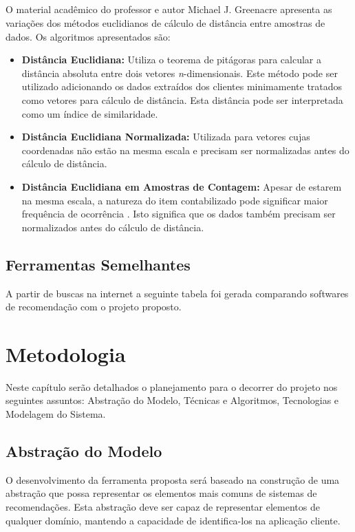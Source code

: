 \documentclass[
	12pt,				%
    oneside,			%
	a4paper,			%
	english,			%
	french,				%
	spanish,			%
	brazil,				%
	]{abntex2}
\begin{document}
\section{}
O material acadêmico do professor e autor Michael J. Greenacre apresenta as variações dos métodos euclidianos de cálculo de distância entre amostras de dados. Os algoritmos apresentados são:

\begin{itemize}
	\item \textbf{Distância Euclidiana:} Utiliza o teorema de pitágoras para calcular a distância absoluta entre dois vetores \textit{n}-dimensionais. Este método pode ser utilizado adicionando os dados extraídos 
	dos clientes minimamente tratados como vetores para cálculo de distância. Esta distância pode ser interpretada como um índice de similaridade.
	\item \textbf{Distância Euclidiana Normalizada:} Utilizada para vetores cujas coordenadas não estão na mesma escala e precisam ser normalizadas antes do cálculo de distância. 
	\item \textbf{Distância Euclidiana em Amostras de Contagem:} Apesar de estarem na mesma escala, a natureza do item contabilizado pode significar maior frequência de ocorrência \cite{7-MeasuresBetweenSamples}. 
	Isto significa que os dados também precisam ser normalizados antes do cálculo de distância. 
\end{itemize}

\section{Ferramentas Semelhantes}
A partir de buscas na internet a seguinte tabela foi gerada comparando softwares de recomendação com o projeto proposto.

\chapter{Metodologia}
Neste capítulo serão detalhados o planejamento para o decorrer do projeto nos seguintes assuntos: Abstração do Modelo, Técnicas e Algoritmos, Tecnologias e
Modelagem do Sistema.

\section{Abstração do Modelo}
O desenvolvimento da ferramenta proposta será baseado na construção de uma abstração que possa representar os elementos mais comuns de sistemas de recomendações.
Esta abstração deve ser capaz de representar elementos de qualquer domínio, mantendo a capacidade de identifica-los na aplicação cliente. 
\end{document}
